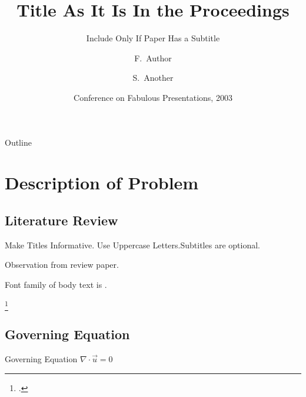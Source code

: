 \documentclass[aspectratio=169]{beamer}
\title[Short Paper Title] %
{Title As It Is In the Proceedings}
\subtitle
{Include Only If Paper Has a Subtitle}
\author[Author, Another] %
{F.~Author\inst{1} \and S.~Another\inst{2}}
\institute[Universities of Somewhere and Elsewhere] %
{
  \inst{1}%
  Department of Computer Science\\
  University of Somewhere
  \and
  \inst{2}%
  Department of Theoretical Philosophy\\
  University of Elsewhere}
\date[CFP 2003] %
{Conference on Fabulous Presentations, 2003}
\begin{document}
\begin{frame}
    \titlepage
\end{frame}

\begin{frame}{Outline}
    \tableofcontents
\end{frame}





\section{Description of Problem}

\subsection{Literature Review}

\begin{frame}{Make Titles Informative. Use Uppercase Letters.}{Subtitles are optional.}

    Observation from review paper. \footnotemark[1]

    Font family of body text is \familydefault.

    \addtocounter{footnote}{1}
    \footcitetext[1]{alvesNumericalMethods2021}

\end{frame}

\subsection{Governing Equation}
\begin{frame}{Governing Equation}
    \begin{math}
        \nabla \cdot \vec{u} = 0
    \end{math}
\end{frame}
\end{document}
